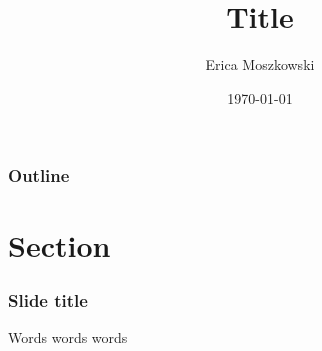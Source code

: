 \documentclass{beamer}
\begin{document}
\title{Title}
\author{Erica Moszkowski}
\date{\today}

\begin{frame}
\titlepage
\end{frame}

\begin{frame}
\frametitle{Outline}
\tableofcontents
\end{frame}

\section{Section}
\begin{frame}[fragile]  %
  \frametitle{Slide title}
  Words words words
\end{frame}
\end{document}
